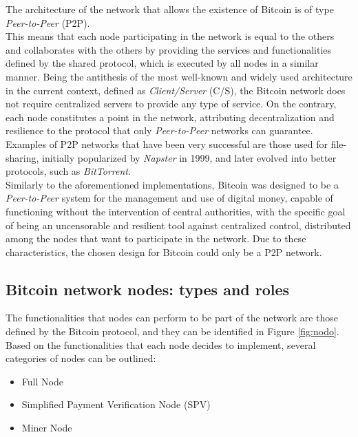 The architecture of the network that allows the existence of Bitcoin is of type \textit{Peer-to-Peer} (P2P).\\This means that each node participating in the network is equal to the others and collaborates with the others by providing the services and functionalities defined by the shared protocol, which is executed by all nodes in a similar manner. Being the antithesis of the most well-known and widely used architecture in the current context, defined as \textit{Client/Server} (C/S), the Bitcoin network does not require centralized servers to provide any type of service. On the contrary, each node constitutes a point in the network, attributing decentralization and resilience to the protocol that only \textit{Peer-to-Peer} networks can guarantee. Examples of P2P networks that have been very successful are those used for file-sharing, initially popularized by \textit{Napster} in 1999, and later evolved into better protocols, such as \textit{BitTorrent}.\\

\noindent Similarly to the aforementioned implementations, Bitcoin was designed to be a \textit{Peer-to-Peer} system for the management and use of digital money, capable of functioning without the intervention of central authorities, with the specific goal of being an uncensorable and resilient tool against centralized control, distributed among the nodes that want to participate in the network. Due to these characteristics, the chosen design for Bitcoin could only be a P2P network.

\subsection{Bitcoin network nodes: types and roles}
The functionalities that nodes can perform to be part of the network are those defined by the Bitcoin protocol, and they can be identified in Figure \ref{fig:nodo}.
Based on the functionalities that each node decides to implement, several categories of nodes can be outlined:
\begin{itemize}
\item Full Node
\item Simplified Payment Verification Node (SPV)
\item Miner Node
\end{itemize}

